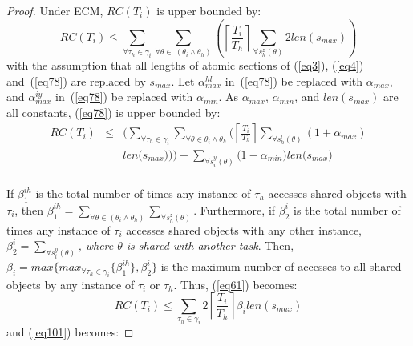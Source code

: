 \begin{proof}\normalfont
Under ECM, $RC(T_{i})$ is upper bounded by:
\begin{equation}
RC(T_{i})\le\sum_{\forall \tau_{h}\in\gamma_{i}}\sum_{\forall \theta\in\ (\theta_{i}\wedge\theta_{h})}\left(\left\lceil\frac{T_{i}}{T_{h}}\right\rceil\sum_{\forall s_{h}^{z}(\theta)}2len(s_{max})\right)\label{eq61}\end{equation}
with the assumption that all lengths of atomic sections of (\ref{eq3}), (\ref{eq4}) and~(\ref{eq78}) are replaced by $s_{max}$.
Let $\alpha_{max}^{hl}$ in~(\ref{eq78}) be replaced with $\alpha_{max}$, and $\alpha_{max}^{iy}$ in~(\ref{eq78}) be replaced with $\alpha_{min}$. 
As $\alpha_{max}$, $\alpha_{min}$, and $len(s_{max})$ are all constants, (\ref{eq78}) is upper bounded by:
\begin{eqnarray}
RC(T_i) & \le & \Bigg(\sum_{\forall \tau_h \in \gamma_i}\sum_{\forall\theta \in \theta_i \wedge \theta_h}\Bigg(\left\lceil\frac{T_{i}}{T_{h}}\right\rceil\sum_{\forall s_{h}^{l}(\theta)}\left(1+\alpha_{max}\right)\nonumber\\
& & len\Big(s_{max}\Big)\Bigg)\Bigg)
 +  \sum_{\forall s_{i}^{y}(\theta)}\Big(1-\alpha_{min}\Big)len\Big(s_{max}\Big)\nonumber\\ 
\label{eq101}\end{eqnarray}

If $\beta_1^{ih}$ is the total number of times any instance of $\tau_h$ accesses shared objects with $\tau_i$, then $\beta_1^{ih}=\sum_{\forall \theta\in(\theta_{i}\wedge\theta_{h})}\sum_{\forall s_{h}^{z}(\theta)}$. Furthermore, if $\beta_2^i$ is the total number of times any instance of $\tau_i$ accesses shared objects with any other instance,   $\beta_2^i=\sum_{\forall s_{i}^{y}(\theta)}$\textit{, where $\theta$ is shared with another task}. Then, $\beta_{i}=max\{max_{\forall \tau_h \in \gamma_i}\{\beta_1^{ih}\},\beta_2^i\}$ is the maximum number of accesses to all shared objects by any instance of $\tau_{i}$ or $\tau_{h}$. 
Thus, (\ref{eq61}) becomes:
\begin{equation}
RC(T_{i})\le\sum_{\tau_{h}\in\gamma_{i}}2\left\lceil\frac{T_{i}}{T_{h}}\right\rceil\beta_{i}len(s_{max})
\label{eq63}\end{equation}
and (\ref{eq101}) becomes:


\end{proof}
